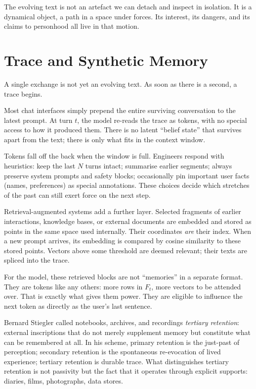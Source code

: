 The evolving text is not an artefact we can detach and inspect in isolation. It is a dynamical object, a path in a space under forces. Its interest, its dangers, and its claims to personhood all live in that motion.

\section{Trace and Synthetic Memory}

A single exchange is not yet an evolving text. As soon as there is a second, a trace begins.

Most chat interfaces simply prepend the entire surviving conversation to the latest prompt. At turn $t$, the model re-reads the trace as tokens, with no special access to how it produced them. There is no latent ``belief state'' that survives apart from the text; there is only what fits in the context window.

Tokens fall off the back when the window is full. Engineers respond with heuristics: keep the last $N$ turns intact; summarise earlier segments; always preserve system prompts and safety blocks; occasionally pin important user facts (names, preferences) as special annotations. These choices decide which stretches of the past can still exert force on the next step.

Retrieval-augmented systems add a further layer. Selected fragments of earlier interactions, knowledge bases, or external documents are embedded and stored as points in the same space used internally. Their coordinates \emph{are} their index. When a new prompt arrives, its embedding is compared by cosine similarity to these stored points. Vectors above some threshold are deemed relevant; their texts are spliced into the trace.

For the model, these retrieved blocks are not ``memories'' in a separate format. They are tokens like any others: more rows in $F_t$, more vectors to be attended over. That is exactly what gives them power. They are eligible to influence the next token as directly as the user's last sentence.

Bernard Stiegler called notebooks, archives, and recordings \emph{tertiary retention}: external inscriptions that do not merely supplement memory but constitute what can be remembered at all.\cite{stiegler2009technics} In his scheme, primary retention is the just-past of perception; secondary retention is the spontaneous re-evocation of lived experience; tertiary retention is durable trace. What distinguishes tertiary retention is not passivity but the fact that it operates through explicit supports: diaries, films, photographs, data stores.

